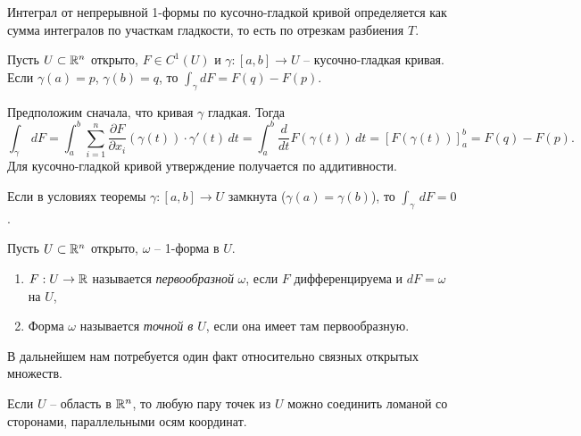 Интеграл от непрерывной 1-формы по кусочно-гладкой кривой определяется как сумма интегралов по участкам гладкости, то есть по отрезкам разбиения $T$.

\begin{theorem}
	Пусть $U \subset \mathbb{R}^n$ открыто, $F \in C^1(U)$ и $\gamma : [a, b] \to U$ -- кусочно-гладкая кривая. 
	Если $\gamma(a) = p$, $\gamma(b) = q$, то $\int_{\gamma} d F = F(q) - F(p)$.
\end{theorem}

\begin{myproof}
	Предположим сначала, что кривая $\gamma$ гладкая. Тогда 
	\[ \int_{\gamma} \, d F = \int_{a}^{b} \sum \limits_{i=1}^{n} \frac{\partial F}{\partial x_i} (\gamma(t)) \cdot \gamma'(t) \, dt = \int_{a}^{b} \frac{d}{dt} F(\gamma(t)) \, dt = [F(\gamma(t))]_{a}^{b} = F(q) - F(p). \]
	Для кусочно-гладкой кривой утверждение получается по аддитивности.
\end{myproof}

\begin{corollary}
	Если в условиях теоремы $\gamma : [a, b] \to U$ замкнута ($\gamma(a) = \gamma(b)$), то 
	$\int_{\gamma} \, d F = 0$.
\end{corollary}

\begin{definition}
	Пусть $U \subset \mathbb{R}^n$ открыто, $\omega$ -- 1-форма в $U$. 
	\begin{enumerate}[itemsep = 0pt, topsep = 5pt]
		\item $F : U \to \mathbb{R}$ называется \textit{первообразной} $\omega$, если $F$ дифференцируема и $d F = \omega$ на $U$, 
		\item Форма $\omega$ называется \textit{точной в $U$}, если она имеет там первообразную.
	\end{enumerate}
\end{definition}

В дальнейшем нам потребуется один факт относительно связных открытых множеств.

\begin{lemma}
	Если $U$ -- область в $\mathbb{R}^n$, то любую пару точек из $U$ можно соединить ломаной со сторонами, параллельными осям координат.
\end{lemma}


